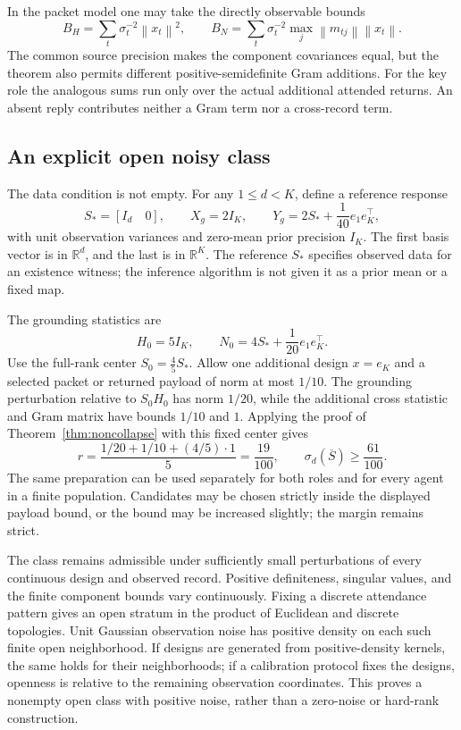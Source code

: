 \documentclass[11pt]{article}
\theoremstyle{definition}
\theoremstyle{remark}
\newcommand{\R}{\mathbb R}
\newcommand{\norm}[1]{\left\lVert #1\right\rVert}
\begin{document}
In the packet model one may take the directly observable bounds
\begin{equation}
B_H=\sum_t\sigma_t^{-2}\norm{x_t}^2,\qquad
B_N=\sum_t\sigma_t^{-2}\max_j\norm{m_{tj}}\norm{x_t}.
\label{eq:packet-bounds}
\end{equation}
The common source precision makes the component covariances equal, but the theorem also permits different positive-semidefinite Gram additions. For the key role the analogous sums run only over the actual additional attended returns. An absent reply contributes neither a Gram term nor a cross-record term.

\subsection{An explicit open noisy class}

The data condition is not empty. For any \(1\le d<K\), define a reference response
\[
S_*=[I_d\quad0],\qquad
X_g=2I_K,\qquad
Y_g=2S_*+\frac1{40}e_1e_K^\top,
\]
with unit observation variances and zero-mean prior precision \(I_K\). The first basis vector is in \(\R^d\), and the last is in \(\R^K\). The reference \(S_*\) specifies observed data for an existence witness; the inference algorithm is not given it as a prior mean or a fixed map.

The grounding statistics are
\[
H_0=5I_K,\qquad
N_0=4S_*+\frac1{20}e_1e_K^\top.
\]
Use the full-rank center \(S_0=\frac45S_*\). Allow one additional design \(x=e_K\) and a selected packet or returned payload of norm at most \(1/10\). The grounding perturbation relative to \(S_0H_0\) has norm \(1/20\), while the additional cross statistic and Gram matrix have bounds \(1/10\) and \(1\). Applying the proof of Theorem~\ref{thm:noncollapse} with this fixed center gives
\begin{equation}
r=
\frac{1/20+1/10+(4/5)\cdot1}{5}
=
\frac{19}{100},
\qquad
\boxed{\sigma_d(\overline S)\ge\frac{61}{100}.}
\label{eq:explicit-margin}
\end{equation}
The same preparation can be used separately for both roles and for every agent in a finite population. Candidates may be chosen strictly inside the displayed payload bound, or the bound may be increased slightly; the margin remains strict.

The class remains admissible under sufficiently small perturbations of every continuous design and observed record. Positive definiteness, singular values, and the finite component bounds vary continuously. Fixing a discrete attendance pattern gives an open stratum in the product of Euclidean and discrete topologies. Unit Gaussian observation noise has positive density on each such finite open neighborhood. If designs are generated from positive-density kernels, the same holds for their neighborhoods; if a calibration protocol fixes the designs, openness is relative to the remaining observation coordinates. This proves a nonempty open class with positive noise, rather than a zero-noise or hard-rank construction.
\end{document}
